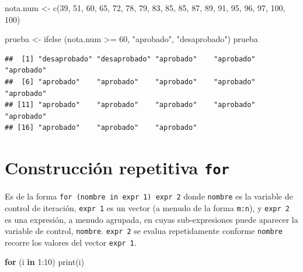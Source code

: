 \documentclass[
]{book}
\newenvironment{Shaded}{\begin{snugshade}}{\end{snugshade}}
\newcommand{\ControlFlowTok}[1]{\textcolor[rgb]{0.13,0.29,0.53}{\textbf{#1}}}
\newcommand{\DecValTok}[1]{\textcolor[rgb]{0.00,0.00,0.81}{#1}}
\newcommand{\FunctionTok}[1]{\textcolor[rgb]{0.00,0.00,0.00}{#1}}
\newcommand{\NormalTok}[1]{#1}
\newcommand{\OtherTok}[1]{\textcolor[rgb]{0.56,0.35,0.01}{#1}}
\newcommand{\SpecialCharTok}[1]{\textcolor[rgb]{0.00,0.00,0.00}{#1}}
\newcommand{\StringTok}[1]{\textcolor[rgb]{0.31,0.60,0.02}{#1}}
\begin{document}
\begin{Shaded}
\begin{Highlighting}[]
\NormalTok{nota.num }\OtherTok{\textless{}{-}} \FunctionTok{c}\NormalTok{(}\DecValTok{39}\NormalTok{, }\DecValTok{51}\NormalTok{, }\DecValTok{60}\NormalTok{, }\DecValTok{65}\NormalTok{, }\DecValTok{72}\NormalTok{, }\DecValTok{78}\NormalTok{, }\DecValTok{79}\NormalTok{, }\DecValTok{83}\NormalTok{, }\DecValTok{85}\NormalTok{, }\DecValTok{85}\NormalTok{, }\DecValTok{87}\NormalTok{, }\DecValTok{89}\NormalTok{, }\DecValTok{91}\NormalTok{, }\DecValTok{95}\NormalTok{, }\DecValTok{96}\NormalTok{, }\DecValTok{97}\NormalTok{, }\DecValTok{100}\NormalTok{, }\DecValTok{100}\NormalTok{)}

\NormalTok{prueba }\OtherTok{\textless{}{-}} \FunctionTok{ifelse}\NormalTok{ (nota.num }\SpecialCharTok{\textgreater{}=} \DecValTok{60}\NormalTok{, }\StringTok{"aprobado"}\NormalTok{, }\StringTok{"desaprobado"}\NormalTok{)}
\NormalTok{prueba}
\end{Highlighting}
\end{Shaded}

\begin{verbatim}
##  [1] "desaprobado" "desaprobado" "aprobado"    "aprobado"    "aprobado"   
##  [6] "aprobado"    "aprobado"    "aprobado"    "aprobado"    "aprobado"   
## [11] "aprobado"    "aprobado"    "aprobado"    "aprobado"    "aprobado"   
## [16] "aprobado"    "aprobado"    "aprobado"
\end{verbatim}

\hypertarget{construcciuxf3n-repetitiva-for}{%
\section{\texorpdfstring{Construcción repetitiva \texttt{for}}{Construcción repetitiva for}}\label{construcciuxf3n-repetitiva-for}}

Es de la forma \texttt{for\ (nombre\ in\ expr\ 1)\ expr\ 2} donde \texttt{nombre} es la variable de control de iteración, \texttt{expr\ 1} es un vector (a menudo de la forma \texttt{m:n}), y \texttt{expr\ 2} es una expresión, a menudo agrupada, en cuyas sub-expresiones puede aparecer la variable de control, \texttt{nombre}. \texttt{expr\ 2} se evalua repetidamente conforme \texttt{nombre} recorre los valores del vector \texttt{expr\ 1}.

\begin{Shaded}
\begin{Highlighting}[]
\ControlFlowTok{for}\NormalTok{ (i }\ControlFlowTok{in} \DecValTok{1}\SpecialCharTok{:}\DecValTok{10}\NormalTok{) }\FunctionTok{print}\NormalTok{(i)}
\end{Highlighting}
\end{Shaded}
\end{document}
